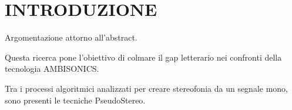 \newcommand{\mylanguages}{english,italian} %
\newcommand{\mytitle}{Stereophonic Mathematical Models}
\newcommand{\mysubtitle}{Stereophonic Mathematical Models}
\newcommand{\authorone}{Perla Catucci}
\newcommand{\institutione}{Conservatorio N. Piccinni di Bari}
\newcommand{\emailone}{perlacatucci150 @ gmail.com}
\newcommand{\authortwo}{Michele Ruzzi}
\newcommand{\institutiontwo}{Conservatorio N. Piccinni di Bari}
\newcommand{\emailtwo}{m.ruzzi @ icloud.com} %
\newcommand{\authorthree}{Giuseppe Silvi}
\newcommand{\institutionthree}{Conservatorio N. Piccinni di Bari}
\newcommand{\emailthree}{grammaton @ me.com} %


\maketitle
\thispagestyle{empty}
\section*{INTRODUZIONE}
Argomentazione attorno all'abstract.

Questa ricerca pone l'obiettivo di colmare il gap letterario nei confronti
della tecnologia AMBISONICS.

Tra i processi algoritmici analizzati per creare stereofonia da un segnale mono,
sono presenti le tecniche PseudoStereo.
